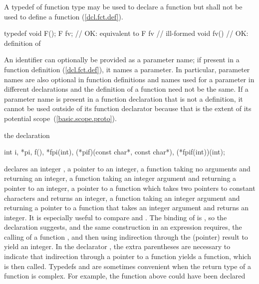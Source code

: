 \pnum
{}%
A typedef of function type may be used to declare a function but shall not be
used to define a function (\ref{dcl.fct.def}).
\enterexample

\begin{codeblock}
typedef void F();
F  fv;              // OK: equivalent to 
F  fv { }           // ill-formed
void fv() { }       // OK: definition of 
\end{codeblock}
\exitexample

\pnum
An identifier can optionally be provided as a parameter name;
if present in a function definition (\ref{dcl.fct.def}), it names a parameter.
\enternote
In particular, parameter names are also optional in function definitions
and names used for a parameter in different declarations and the definition
of a function need not be the same.
If a parameter name is present in a function declaration that is not a definition,
it cannot be used outside of
its function declarator because that is the extent of its potential scope~(\ref{basic.scope.proto}).
\exitnote

\pnum
\enterexample
the declaration

%
\begin{codeblock}
int i,
    *pi,
    f(),
    *fpi(int),
    (*pif)(const char*, const char*),
    (*fpif(int))(int);
\end{codeblock}

declares an integer
,
a pointer
to an integer,
a function
taking no arguments and returning an integer,
a function
taking an integer argument and returning a pointer to an integer,
a pointer
to a function which
takes two pointers to constant characters and returns an integer,
a function
taking an integer argument and returning a pointer to a function that takes an integer argument and returns an integer.
It is especially useful to compare
and
.
The binding of
is
,
so the declaration suggests,
and the same construction in an expression
requires, the calling of a function
,
and then using indirection through the (pointer) result
to yield an integer.
In the declarator
,
the extra parentheses are necessary to indicate that indirection through
a pointer to a function yields a function, which is then called.
\exitexample
\enternote
Typedefs and  are sometimes convenient when the return type of a function is complex.
For example,
the function
above could have been declared

